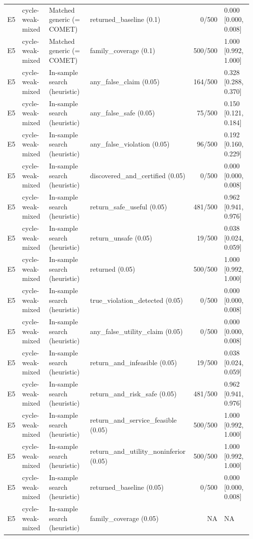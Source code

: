 \begin{longtable}{p{.04\linewidth}p{.18\linewidth}p{.19\linewidth}p{.16\linewidth}r p{.21\linewidth}}
E5 & cycle-weak-mixed & Matched generic (= COMET) & returned\_baseline (0.1) & 0/500 & 0.000 [0.000, 0.008]\\
E5 & cycle-weak-mixed & Matched generic (= COMET) & family\_coverage (0.1) & 500/500 & 1.000 [0.992, 1.000]\\
E5 & cycle-weak-mixed & In-sample search (heuristic) & any\_false\_claim (0.05) & 164/500 & 0.328 [0.288, 0.370]\\
E5 & cycle-weak-mixed & In-sample search (heuristic) & any\_false\_safe (0.05) & 75/500 & 0.150 [0.121, 0.184]\\
E5 & cycle-weak-mixed & In-sample search (heuristic) & any\_false\_violation (0.05) & 96/500 & 0.192 [0.160, 0.229]\\
E5 & cycle-weak-mixed & In-sample search (heuristic) & discovered\_and\_certified (0.05) & 0/500 & 0.000 [0.000, 0.008]\\
E5 & cycle-weak-mixed & In-sample search (heuristic) & return\_safe\_useful (0.05) & 481/500 & 0.962 [0.941, 0.976]\\
E5 & cycle-weak-mixed & In-sample search (heuristic) & return\_unsafe (0.05) & 19/500 & 0.038 [0.024, 0.059]\\
E5 & cycle-weak-mixed & In-sample search (heuristic) & returned (0.05) & 500/500 & 1.000 [0.992, 1.000]\\
E5 & cycle-weak-mixed & In-sample search (heuristic) & true\_violation\_detected (0.05) & 0/500 & 0.000 [0.000, 0.008]\\
E5 & cycle-weak-mixed & In-sample search (heuristic) & any\_false\_utility\_claim (0.05) & 0/500 & 0.000 [0.000, 0.008]\\
E5 & cycle-weak-mixed & In-sample search (heuristic) & return\_and\_infeasible (0.05) & 19/500 & 0.038 [0.024, 0.059]\\
E5 & cycle-weak-mixed & In-sample search (heuristic) & return\_and\_risk\_safe (0.05) & 481/500 & 0.962 [0.941, 0.976]\\
E5 & cycle-weak-mixed & In-sample search (heuristic) & return\_and\_service\_feasible (0.05) & 500/500 & 1.000 [0.992, 1.000]\\
E5 & cycle-weak-mixed & In-sample search (heuristic) & return\_and\_utility\_noninferior (0.05) & 500/500 & 1.000 [0.992, 1.000]\\
E5 & cycle-weak-mixed & In-sample search (heuristic) & returned\_baseline (0.05) & 0/500 & 0.000 [0.000, 0.008]\\
E5 & cycle-weak-mixed & In-sample search (heuristic) & family\_coverage (0.05) & NA & NA\\

\end{longtable}
